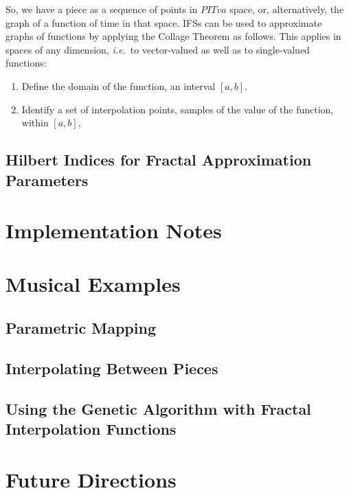 \documentclass[english,11pt,letterpaper,onecolumn]{scrartcl}
\numberwithin{equation}{section}
\begin{document}
    So, we have a piece as a sequence of points in $PITva$ space, or, 
    alternatively, the graph of a function of time in that space. IFSs can 
    be used to approximate graphs of functions by applying the Collage Theorem 
    as follows. This applies in spaces of any dimension, \textit{i.e.}\ to 
    vector-valued as 
    well as to single-valued functions:
    
    \begin{enumerate}
        \item Define the domain of the function, an interval $[a, b]$.
        \item Identify a set of interpolation points, samples of the value of the 
        function, within $[a, b]$, 
    \end{enumerate}
    
    
    
    
    
    
    
    
    
    
    \subsection{Hilbert Indices for Fractal Approximation Parameters}
    
    \section{Implementation Notes}
    
    \section{Musical Examples}
    
    \subsection{Parametric Mapping}
    
    
    \subsection{Interpolating Between Pieces}
    
    
    \subsection{Using the Genetic Algorithm with Fractal Interpolation Functions}
    
    \section{Future Directions}
    
\end{document}
